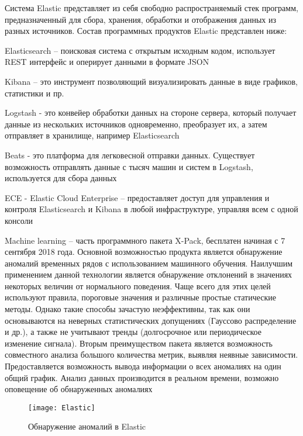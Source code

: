 Система Elastic представляет из себя свободно распространяемый стек программ, предназначенный для сбора, хранения, обработки и отображения данных из разных источников. 
Состав программных продуктов Elastic представлен ниже: 
\begin{itemize*}
	\item{Elasticsearch – поисковая система с открытым исходным кодом, использует REST интерфейс и оперирует данными в формате JSON}
	\item{Kibana – это инструмент позволяющий визуализировать данные в виде графиков, статистики и пр.}
	\item{Logstash - это конвейер обработки данных на стороне сервера, который получает данные из нескольких источников одновременно, преобразует их, а затем отправляет в хранилище, например Elasticsearch}
	\item{Beats - это платформа для легковесной отправки данных. Существует возможность отправлять данные с тысяч машин и систем в Logstash, используется для сбора данных}
	\item{ECE - Elastic Cloud Enterprise – предоставляет доступ для управления и контроля Elasticsearch и Kibana в любой инфраструктуре, управляя всем с одной консоли}
	\item{Machine learning – часть программного пакета X-Pack, бесплатен начиная с 7 сентября 2018 года. Основной возможностью продукта является обнаружение аномалий временных рядов с использованием машинного обучения. Наилучшим применением данной технологии является обнаружение отклонений в значениях некоторых величин от нормального поведения. Чаще всего для этих целей используют правила, пороговые значения и различные простые статические методы. Однако такие способы зачастую неэффективны, так как они основываются на неверных статистических допущениях (Гауссово распределение и др.), а также не учитывают тренды (долгосрочное или периодическое изменение сигнала). Вторым преимуществом пакета является возможность совместного анализа большого количества метрик, выявляя неявные зависимости. Предоставляется возможность вывода информации о всех аномалиях на один общий график. Анализ данных производится в реальном времени, возможно оповещение об обнаруженных аномалиях}
\end{itemize*}

\begin{figure}[H]
	\centering
	\texttt{[image: Elastic]}
	\caption{Обнаружение аномалий в Elastic}
	\label{fig:Elastic}
\end{figure}

